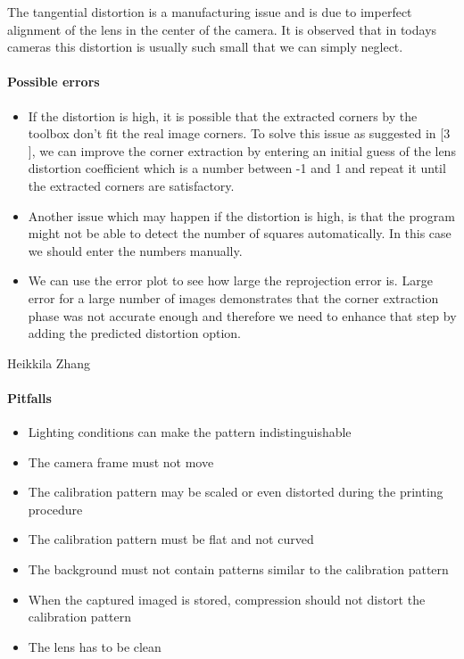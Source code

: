 \documentclass{scrartcl}
\begin{document}
The tangential distortion is a manufacturing issue and  is due to imperfect alignment of the lens in the center of the camera. It is observed that in todays cameras this distortion is usually such small that we can simply neglect.



\paragraph{Possible errors}
\begin{itemize}
\item If the distortion is high, it is possible that the extracted corners by the toolbox don't fit the real image corners. To solve this issue as suggested in [3 ], we can improve the corner extraction by entering an initial guess of the lens distortion coefficient which is a number between -1 and 1 and repeat it until the extracted corners are satisfactory.



\item Another issue which may happen if the distortion is high, is that the program might not be able to detect the number of squares automatically. In this case we should enter the numbers manually.

\item We can use the error plot to see how large the reprojection error is. Large error for a large number of images demonstrates that the corner extraction phase was not accurate enough and therefore we need to enhance that step by adding the predicted distortion option.

\end{itemize}


Heikkila\cite{heikkila}
Zhang\cite{zhang}

\paragraph{Pitfalls}
\begin{itemize}
\item Lighting conditions can make the pattern indistinguishable
\item The camera frame must not move
\item The calibration pattern may be scaled or even distorted during the printing procedure
\item The calibration pattern must be flat and not curved
\item The background must not contain patterns similar to the calibration pattern
\item When the captured imaged is stored, compression should not distort the calibration pattern
\item The lens has to be clean
\end{itemize}
\end{document}
